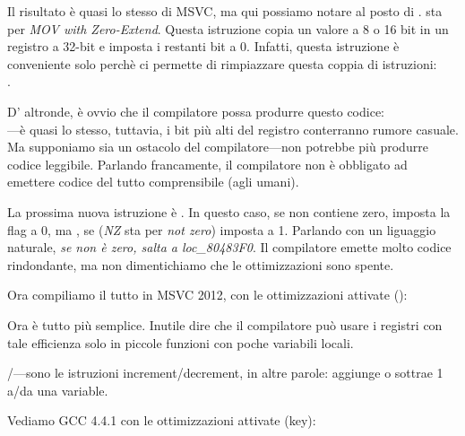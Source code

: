 Il risultato è quasi lo stesso di MSVC, ma qui possiamo notare \MOVZX al posto di \MOVSX. 
\MOVZX sta per \emph{MOV with Zero-Extend}. 
Questa istruzione copia un valore a 8 o 16 bit in un registro a 32-bit e imposta i restanti bit a 0. 
Infatti, questa istruzione è conveniente solo perchè ci permette di rimpiazzare questa coppia di istruzioni:\\
.

D' altronde, è ovvio che il compilatore possa produrre questo codice:\\
---è quasi lo stesso, tuttavia, 
i bit più alti del registro \EAX conterranno rumore casuale. 
Ma supponiamo sia un ostacolo del compilatore---non potrebbe più produrre codice leggibile. 
Parlando francamente, il compilatore non è obbligato ad emettere codice del tutto comprensibile (agli umani).


La prossima nuova istruzione è \SETNZ. 
In questo caso, se \AL non contiene zero,  
imposta la flag \ZF a 0, ma \SETNZ, se  (\emph{NZ} sta per \emph{not zero}) imposta \AL a 1.
Parlando con un liguaggio naturale, \emph{se \AL non è zero, salta a loc\_80483F0}. 
Il compilatore emette molto codice rindondante, ma non dimentichiamo che le ottimizzazioni sono spente.

\label{strlen_MSVC_Ox}

Ora compiliamo il tutto in MSVC 2012, con le ottimizzazioni attivate (\Ox):



Ora è tutto più semplice.
Inutile dire che il compilatore può usare i registri con tale efficienza 
solo in piccole funzioni con poche variabili locali.

\INC/\DEC---sono le istruzioni \gls{increment}/\gls{decrement}, in altre parole: aggiunge o sottrae 1 a/da una variable.




Vediamo GCC 4.4.1 con le ottimizzazioni attivate (\Othree key):


 
